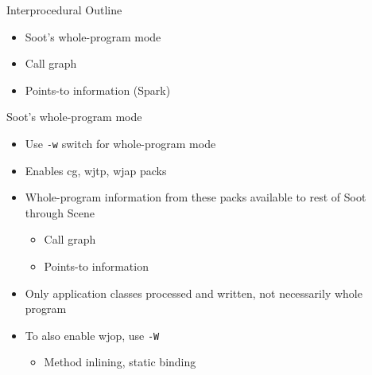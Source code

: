 \begin{slide}{Interprocedural Outline}
\begin{itemize}
\item Soot's whole-program mode
\item Call graph
\item Points-to information (Spark)
\end{itemize}
\end{slide}

\begin{slide}{Soot's whole-program mode}
\begin{itemize}
\item Use \texttt{-w} switch for whole-program mode
\item Enables cg, wjtp, wjap packs
\item Whole-program information from these packs available to rest of Soot through Scene
\begin{itemize}
\item Call graph
\item Points-to information
\end{itemize}
\item Only application classes processed and written, not necessarily whole program
\item To also enable wjop, use \texttt{-W}
\begin{itemize}
\item Method inlining, static binding
\end{itemize}
\end{itemize}
\end{slide}





